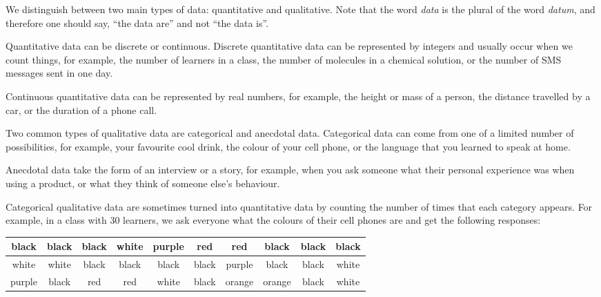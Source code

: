 We distinguish between two main types of data: quantitative and
qualitative. Note that the word {\em data} is the plural of the word {\em datum}, and
  therefore one should say, ``the data are'' and not ``the data is''.


Quantitative data can be discrete or continuous. Discrete quantitative
data can be represented by integers and usually occur when we count
things, for example, the number of learners in a class, the number of
molecules in a chemical solution, or the number of SMS messages sent
in one day.\par

Continuous quantitative data can be represented by real numbers, for
example, the height or mass of a person, the distance travelled by a
car, or the duration of a phone call.


Two common types of qualitative data are categorical and anecdotal
data. Categorical data can come from one of a limited number of
possibilities, for example, your favourite cool drink, the colour of
your cell phone, or the language that you learned to speak at home.

Anecdotal data take the form of an interview or a story, for example,
when you ask someone what their personal experience was when using a
product, or what they think of someone else's behaviour.

Categorical qualitative data are sometimes turned into quantitative
data by counting the number of times that each category appears. For
example, in a class with $30$ learners, we ask everyone what the
colours of their cell phones are and get the following responses:

  \begin{center}
    \begin{tabular}{|c|c|c|c|c|c|c|c|c|c|}\hline
     
      black & black & black & white & purple & red & red & black & black & black \\ \hline
      white & white & black & black & black & black & purple & black & black & white \\ \hline
      purple & black & red & red & white & black & orange & orange & black & white \\ \hline
     
    \end{tabular}
  \end{center}

